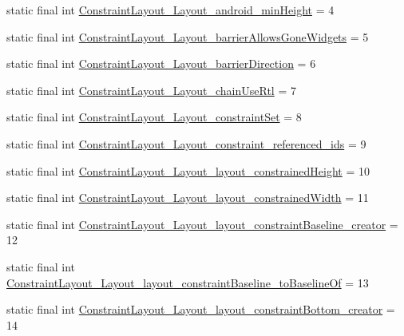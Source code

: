 \begin{DoxyCompactItemize}
\item 
static final int \mbox{\hyperlink{classandroid_1_1support_1_1constraint_1_1_r_1_1styleable_a0ed9f5ad83856f043b752deff63d9bc1}{Constraint\+Layout\+\_\+\+Layout\+\_\+android\+\_\+min\+Height}} = 4
\item 
static final int \mbox{\hyperlink{classandroid_1_1support_1_1constraint_1_1_r_1_1styleable_a19514f247f380bd50e989d22d8af85e1}{Constraint\+Layout\+\_\+\+Layout\+\_\+barrier\+Allows\+Gone\+Widgets}} = 5
\item 
static final int \mbox{\hyperlink{classandroid_1_1support_1_1constraint_1_1_r_1_1styleable_ac27afed338a71abcdbe5ec8c3ea3d727}{Constraint\+Layout\+\_\+\+Layout\+\_\+barrier\+Direction}} = 6
\item 
static final int \mbox{\hyperlink{classandroid_1_1support_1_1constraint_1_1_r_1_1styleable_a7fa9e3690cb51025febc72345945a43b}{Constraint\+Layout\+\_\+\+Layout\+\_\+chain\+Use\+Rtl}} = 7
\item 
static final int \mbox{\hyperlink{classandroid_1_1support_1_1constraint_1_1_r_1_1styleable_a3500019b043e160275860cdfa99d9e4c}{Constraint\+Layout\+\_\+\+Layout\+\_\+constraint\+Set}} = 8
\item 
static final int \mbox{\hyperlink{classandroid_1_1support_1_1constraint_1_1_r_1_1styleable_ae10e71f9ce6782f0e145a2167752a9d0}{Constraint\+Layout\+\_\+\+Layout\+\_\+constraint\+\_\+referenced\+\_\+ids}} = 9
\item 
static final int \mbox{\hyperlink{classandroid_1_1support_1_1constraint_1_1_r_1_1styleable_a4134125c5896ad374e7a0c8c1ba68f83}{Constraint\+Layout\+\_\+\+Layout\+\_\+layout\+\_\+constrained\+Height}} = 10
\item 
static final int \mbox{\hyperlink{classandroid_1_1support_1_1constraint_1_1_r_1_1styleable_ac2987bf017198d19407b723e342fd54c}{Constraint\+Layout\+\_\+\+Layout\+\_\+layout\+\_\+constrained\+Width}} = 11
\item 
static final int \mbox{\hyperlink{classandroid_1_1support_1_1constraint_1_1_r_1_1styleable_a0f9cb84fb067647da83848d1be8627cd}{Constraint\+Layout\+\_\+\+Layout\+\_\+layout\+\_\+constraint\+Baseline\+\_\+creator}} = 12
\item 
static final int \mbox{\hyperlink{classandroid_1_1support_1_1constraint_1_1_r_1_1styleable_a8435fc36cbd1e5f2aa353249accc481a}{Constraint\+Layout\+\_\+\+Layout\+\_\+layout\+\_\+constraint\+Baseline\+\_\+to\+Baseline\+Of}} = 13
\item 
static final int \mbox{\hyperlink{classandroid_1_1support_1_1constraint_1_1_r_1_1styleable_ab3dd331e48f78d1f3c04def8106d353e}{Constraint\+Layout\+\_\+\+Layout\+\_\+layout\+\_\+constraint\+Bottom\+\_\+creator}} = 14

\end{DoxyCompactItemize}
